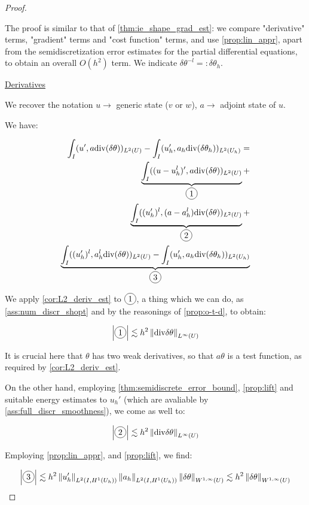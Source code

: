 \documentclass[english,a4paper,9pt,oneside]{scrbook}	%
\theoremstyle{break}
\newenvironment{mproof}[1][\proofname]{%
  \begin{proof}[#1]$ $\par\nobreak\ignorespaces
}{%
  \end{proof}
}
\renewcommand*{\proofname}{Proof}
\theoremstyle{remark}
\newcommand{\norm}[1]{\left\lVert#1\right\rVert}
\newcommand{\te}{\theta}
\newcommand{\dive}{\text{div}}
\newcommand*\circled[1]{\tikz[baseline=(char.base)]{
            \node[shape=circle,draw,inner sep=2pt] (char) {#1};}}
\begin{document}
\begin{mproof}
The proof is similar to that of \cref{thm:ie_shape_grad_est}: we compare "derivative" terms, "gradient" terms and "cost function" terms, and use \cref{prop:lin_appr}, apart from the semidiscretization error estimates for the partial differential equations, to obtain an overall $O(h^2)$ term. We indicate $\delta \te^{-l}=:\delta \te_h$.

\underline{Derivatives}

We recover the notation $u\rightarrow$ generic state ($v$ or $w$), $a\rightarrow$ adjoint state of $u$.

We have:

\begin{align*}
	\int_I(u',a\dive(\delta \te))_{L^2(U)}-\int_I (u_h',a_h\dive(\delta \te_h))_{L^2(U_h)}=\\
	\underbrace{\int_I((u-u_h^l)',a\dive(\delta \te))_{L^2(U)}}_{\circled{1}}+\\
	\underbrace{\int_I((u_h')^l, (a-a_h^l)\dive(\delta \te))_{L^2(U)}}_{\circled{2}}+\\
	\underbrace{\int_I((u_h')^l, a_h^l\dive(\delta \te))_{L^2(U)}-\int_I (u_h',a_h\dive(\delta \te_h))_{L^2(U_h)}}_{\circled{3}}
\end{align*}

We apply \cref{cor:L2_deriv_est} to $\circled{1}$, a thing which we can do, as \cref{ass:num_discr_shopt} and by the reasonings of \cref{prop:o-t-d}, to obtain:

\begin{align*}
	\left | \circled{1} \right | \lesssim h^2\norm{\dive{\delta \theta}}_{L^\infty(U)}
\end{align*}

It is crucial here that $\te$ has two weak derivatives, so that $a\te$ is a test function, as required by \cref{cor:L2_deriv_est}. 

On the other hand, employing \cref{thm:semidiscrete_error_bound}, \cref{prop:lift} and suitable energy estimates to $u_h'$ (which are avaliable by \cref{ass:full_discr_smoothness}), we come as well to:

\begin{align*}
	\left | \circled{2} \right | \lesssim h^2\norm{\dive{\delta \theta}}_{L^\infty(U)}
\end{align*}

Employing \cref{prop:lin_appr}, and \cref{prop:lift}, we find:

\begin{align*}
	\left | \circled{3} \right |\lesssim  h^2 \norm{u_h'}_{L^2(I,H^1(U_h))}\norm{a_h}_{L^2(I,H^1(U_h))}\norm{\delta \te}_{W^{1,\infty}(U)} \lesssim  h^2 \norm{\delta \te}_{W^{1,\infty}(U)}
\end{align*}


\end{mproof}
\end{document}
